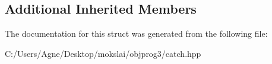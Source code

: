 \subsection*{Additional Inherited Members}


The documentation for this struct was generated from the following file\+:\begin{DoxyCompactItemize}
\item 
C\+:/\+Users/\+Agne/\+Desktop/mokslai/objprog3/catch.\+hpp\end{DoxyCompactItemize}
